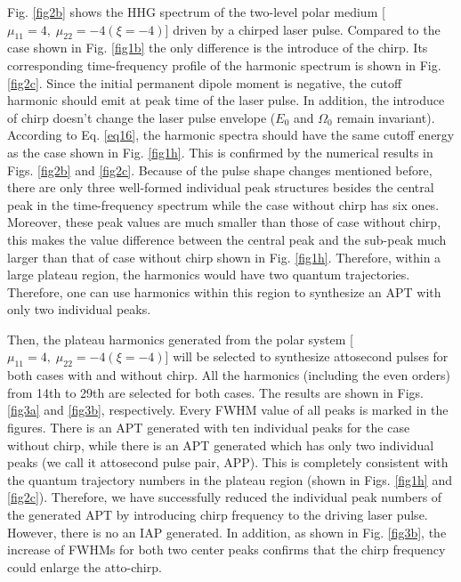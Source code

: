 \documentclass[10pt,letterpaper]{article}
\begin{document}
Fig. \ref{fig2b} shows the HHG spectrum of the two-level polar medium [$\mu_{11}=4,\;\mu_{22}=-4(\xi=-4)$] driven by a chirped laser pulse. Compared to the case shown in Fig. \ref{fig1b} the only difference is the introduce of the chirp. Its corresponding time-frequency profile of the harmonic spectrum is shown in Fig. \ref{fig2c}. Since the initial permanent dipole moment is negative, the cutoff harmonic should emit at peak time of the laser pulse. In addition, the introduce of chirp doesn't change the laser pulse envelope ($E_{0}$ and $\Omega_0$ remain invariant). According to Eq. \ref{eq16}, the harmonic spectra should have the same cutoff energy as the case shown in Fig. \ref{fig1h}. This is confirmed by the numerical results in Figs. \ref{fig2b} and \ref{fig2c}. Because of the pulse shape changes mentioned before, there are only three well-formed individual peak structures besides the central peak in the time-frequency spectrum while the case without chirp has six ones. Moreover, these peak values are much smaller than those of case without chirp, this makes the value difference between the central peak and the sub-peak much larger than that of case without chirp shown in Fig. \ref{fig1h}. Therefore, within a large plateau region, the harmonics would have two quantum trajectories. Therefore, one can use harmonics within this region to synthesize an APT with only two individual peaks. 

Then, the plateau harmonics generated from the polar system [$\mu_{11}=4,\;\mu_{22}=-4(\xi=-4)$] will be selected to synthesize attosecond pulses for both cases with and without chirp. All the harmonics (including the even orders) from 14th to 29th are selected for both cases. The results are shown in Figs. \ref{fig3a} and \ref{fig3b}, respectively. Every FWHM value of all peaks is marked in the figures. There is an APT generated with ten individual peaks for the case without chirp, while there is an APT generated which has only two individual peaks (we call it attosecond pulse pair, APP). This is completely consistent with the quantum trajectory numbers in the plateau region (shown in Figs. \ref{fig1h} and \ref{fig2c}). Therefore, we have successfully reduced the individual peak numbers of the generated APT by introducing chirp frequency to the driving laser pulse. However, there is no an IAP generated. In addition, as shown in Fig. \ref{fig3b}, the increase of FWHMs for both two center peaks confirms that the chirp frequency could enlarge the atto-chirp.
\end{document}
